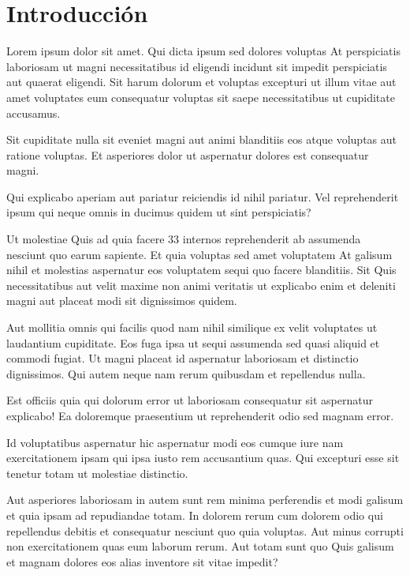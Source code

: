 \chapter*{Introducción}
Lorem ipsum dolor sit amet. Qui dicta ipsum sed dolores voluptas At perspiciatis laboriosam ut magni necessitatibus id eligendi incidunt sit impedit perspiciatis aut quaerat eligendi. Sit harum dolorum et voluptas excepturi ut illum vitae aut amet voluptates eum consequatur voluptas sit saepe necessitatibus ut cupiditate accusamus.

Sit cupiditate nulla sit eveniet magni aut animi blanditiis eos atque voluptas aut ratione voluptas. Et asperiores dolor ut aspernatur dolores est consequatur magni.

Qui explicabo aperiam aut pariatur reiciendis id nihil pariatur. Vel reprehenderit ipsum qui neque omnis in ducimus quidem ut sint perspiciatis?

Ut molestiae Quis ad quia facere 33 internos reprehenderit ab assumenda nesciunt quo earum sapiente. Et quia voluptas sed amet voluptatem At galisum nihil et molestias aspernatur eos voluptatem sequi quo facere blanditiis. Sit Quis necessitatibus aut velit maxime non animi veritatis ut explicabo enim et deleniti magni aut placeat modi sit dignissimos quidem.

Aut mollitia omnis qui facilis quod nam nihil similique ex velit voluptates ut laudantium cupiditate. Eos fuga ipsa ut sequi assumenda sed quasi aliquid et commodi fugiat. Ut magni placeat id aspernatur laboriosam et distinctio dignissimos. Qui autem neque nam rerum quibusdam et repellendus nulla.

Est officiis quia qui dolorum error ut laboriosam consequatur sit aspernatur explicabo! Ea doloremque praesentium ut reprehenderit odio sed magnam error.

Id voluptatibus aspernatur hic aspernatur modi eos cumque iure nam exercitationem ipsam qui ipsa iusto rem accusantium quas. Qui excepturi esse sit tenetur totam ut molestiae distinctio.

Aut asperiores laboriosam in autem sunt rem minima perferendis et modi galisum et quia ipsam ad repudiandae totam. In dolorem rerum cum dolorem odio qui repellendus debitis et consequatur nesciunt quo quia voluptas. Aut minus corrupti non exercitationem quas eum laborum rerum. Aut totam sunt quo Quis galisum et magnam dolores eos alias inventore sit vitae impedit?

